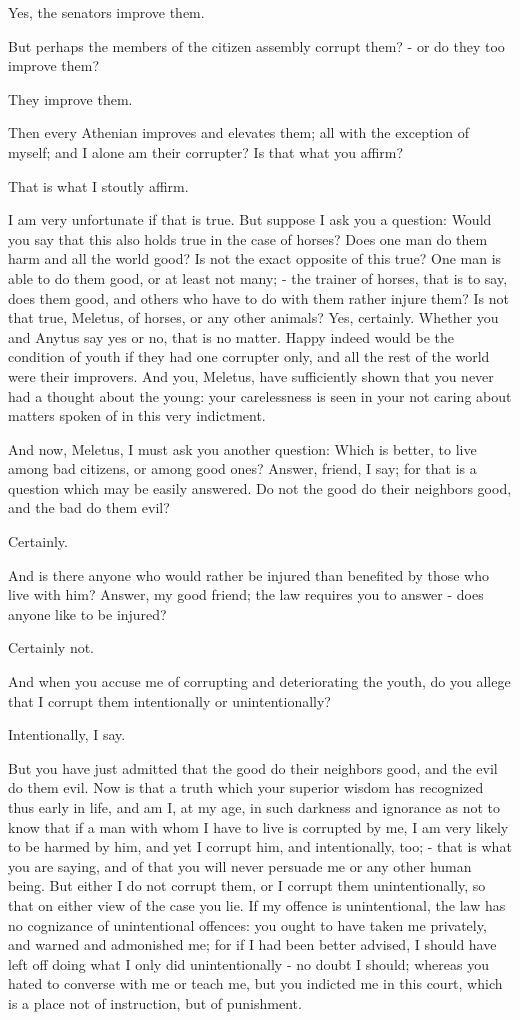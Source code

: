 Yes, the senators improve them. 

But perhaps the members of the citizen assembly corrupt them? - or
do they too improve them? 

They improve them. 

Then every Athenian improves and elevates them; all with the exception
of myself; and I alone am their corrupter? Is that what you affirm?

That is what I stoutly affirm. 

I am very unfortunate if that is true. But suppose I ask you a question:
Would you say that this also holds true in the case of horses? Does
one man do them harm and all the world good? Is not the exact opposite
of this true? One man is able to do them good, or at least not many;
- the trainer of horses, that is to say, does them good, and others
who have to do with them rather injure them? Is not that true, Meletus,
of horses, or any other animals? Yes, certainly. Whether you and Anytus
say yes or no, that is no matter. Happy indeed would be the condition
of youth if they had one corrupter only, and all the rest of the world
were their improvers. And you, Meletus, have sufficiently shown that
you never had a thought about the young: your carelessness is seen
in your not caring about matters spoken of in this very indictment.

And now, Meletus, I must ask you another question: Which is better,
to live among bad citizens, or among good ones? Answer, friend, I
say; for that is a question which may be easily answered. Do not the
good do their neighbors good, and the bad do them evil? 

Certainly. 

And is there anyone who would rather be injured than benefited by
those who live with him? Answer, my good friend; the law requires
you to answer - does anyone like to be injured? 

Certainly not. 

And when you accuse me of corrupting and deteriorating the youth,
do you allege that I corrupt them intentionally or unintentionally?

Intentionally, I say. 

But you have just admitted that the good do their neighbors good,
and the evil do them evil. Now is that a truth which your superior
wisdom has recognized thus early in life, and am I, at my age, in
such darkness and ignorance as not to know that if a man with whom
I have to live is corrupted by me, I am very likely to be harmed by
him, and yet I corrupt him, and intentionally, too; - that is what
you are saying, and of that you will never persuade me or any other
human being. But either I do not corrupt them, or I corrupt them unintentionally,
so that on either view of the case you lie. If my offence is unintentional,
the law has no cognizance of unintentional offences: you ought to
have taken me privately, and warned and admonished me; for if I had
been better advised, I should have left off doing what I only did
unintentionally - no doubt I should; whereas you hated to converse
with me or teach me, but you indicted me in this court, which is a
place not of instruction, but of punishment. 

